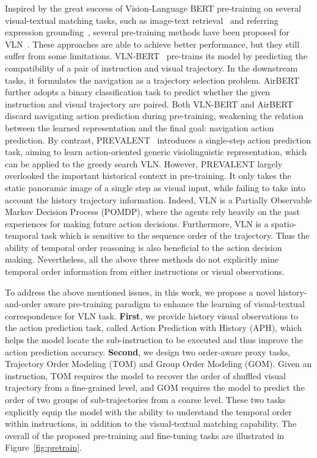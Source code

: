 \documentclass[10pt,twocolumn,letterpaper]{article}
\begin{document}
Inspired by the great success of Vision-Language BERT pre-training on several visual-textual matching tasks, such as image-text retrieval~\cite{itr} and referring expression grounding~\cite{reg}, several pre-training methods have been proposed for VLN~\cite{prevalent,altr,bertvln,airbert}.
These approaches are able to achieve better performance, but they still suffer from some limitations.
VLN-BERT~\cite{bertvln} pre-trains its model by predicting the compatibility of a pair of instruction and visual trajectory. In the downstream tasks, it formulates the navigation as a trajectory selection problem. AirBERT~\cite{airbert} further adopts a binary classification task to predict whether the given instruction and visual trajectory are paired. 
Both VLN-BERT and AirBERT discard navigating action prediction during pre-training, weakening the relation between the learned representation and the final goal: navigation action prediction. 
By contrast, PREVALENT~\cite{prevalent} introduces a single-step action prediction task, aiming to learn action-oriented generic visiolinguistic representation, which can be applied to the greedy search VLN. 
However, PREVALENT largely overlooked the important historical context in pre-training. {It only takes the static panoramic image of a single step as visual input, while failing to take into account the history trajectory information.}
Indeed, VLN is a Partially Observable Markov Decision Process (POMDP), where the agents rely heavily on the past experiences for making future action decisions. {Furthermore, VLN is a spatio-temporal task which is sensitive to the sequence order of the trajectory. Thus the ability of temporal order reasoning is also beneficial to the action decision making. Nevertheless, all the above three methods do not explicitly mine temporal order information from either instructions or visual observations.}

To address the above mentioned issues, in this work, we propose a novel {history-and-order aware} pre-training paradigm to enhance the learning of visual-textual correspondence for VLN task.
\textbf{First}, we provide history visual observations to the action prediction task, called Action Prediction with History (APH), which helps the model locate the sub-instruction to be executed and thus improve the action prediction accuracy.
\textbf{Second}, we design two order-aware proxy tasks, Trajectory Order Modeling (TOM) and Group Order Modeling (GOM). Given an instruction, TOM requires the model to recover the order of shuffled visual trajectory from a fine-grained level, and GOM requires the model to predict the order of two groups of sub-trajectories from a coarse level.
These two tasks explicitly equip the model with the ability to understand the temporal order within instructions, in addition to the visual-textual matching capability. 
The overall of the proposed pre-training and ﬁne-tuning tasks are illustrated in Figure~\ref{fig:pretrain}.
\end{document}
